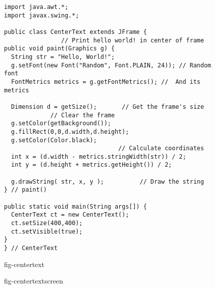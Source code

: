 \begin{figure}[h!]
\jjjprogstart
\begin{jjjlisting}[28pc]
\begin{lstlisting}
import java.awt.*;
import javax.swing.*;

public class CenterText extends JFrame {
                // Print hello world! in center of frame
public void paint(Graphics g) {
  String str = "Hello, World!";
  g.setFont(new Font("Random", Font.PLAIN, 24)); // Random font
  FontMetrics metrics = g.getFontMetrics(); //  And its metrics

  Dimension d = getSize();       // Get the frame's size
             // Clear the frame
  g.setColor(getBackground());
  g.fillRect(0,0,d.width,d.height);
  g.setColor(Color.black);
                                // Calculate coordinates
  int x = (d.width - metrics.stringWidth(str)) / 2; 
  int y = (d.height + metrics.getHeight()) / 2;

  g.drawString( str, x, y );          // Draw the string
} // paint()

public static void main(String args[]) {
  CenterText ct = new CenterText();
  ct.setSize(400,400);
  ct.setVisible(true);
}
} // CenterText
\end{lstlisting}
\end{jjjlisting}
{fig-centertext}
\end{figure}



\begin{figure}[bt]
 {fig-centertextscreen}

\end{figure}


